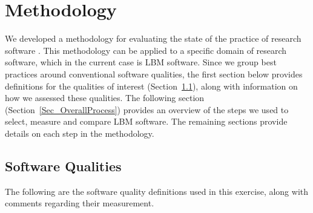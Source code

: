\documentclass[final, 3p, times, authoryear]{elsarticle}
\begin{document}
\section{Methodology} \label{methodology}

We developed a methodology for evaluating the state of the practice of
research software \citep{SmithEtAl2021}. This methodology can be applied
to a specific domain of research software, which in the current case is LBM
software.  Since we group best practices around conventional software qualities,
the first section below provides definitions for the qualities of interest
(Section~\ref{softwarequalities}), along with information on how we assessed
these qualities. The following section (Section~\ref{Sec_OverallProcess})
provides an overview of the steps we used to select, measure and compare LBM
software.  The remaining sections provide details on each step in the methodology. 

\subsection{Software Qualities} \label{softwarequalities}

The following are the software quality definitions used in this exercise, along
with comments regarding their measurement.
\end{document}
